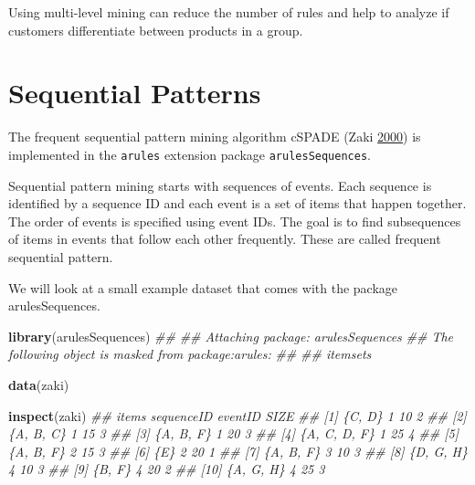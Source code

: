 \documentclass[
  notitlepage]{book}
\newenvironment{Shaded}{\begin{snugshade}}{\end{snugshade}}
\newcommand{\CommentTok}[1]{\textcolor[rgb]{0.56,0.35,0.01}{\textit{#1}}}
\newcommand{\KeywordTok}[1]{\textcolor[rgb]{0.13,0.29,0.53}{\textbf{#1}}}
\newcommand{\NormalTok}[1]{#1}
\begin{document}
Using multi-level mining can reduce the number of rules and help to analyze if
customers differentiate between products in a group.

\hypertarget{sequential-patterns}{%
\section{Sequential Patterns}\label{sequential-patterns}}

The frequent sequential pattern mining algorithm cSPADE (Zaki \protect\hyperlink{ref-Zaki2000}{2000}) is implemented in
the \texttt{arules} extension package \texttt{arulesSequences}.

Sequential pattern mining starts with sequences of events.
Each sequence is identified by a sequence ID and
each event is a set of items that happen together.
The order of events is specified using
event IDs. The goal is to find subsequences of items in events that
follow each other frequently. These are called frequent sequential pattern.

We will look at a small example dataset that comes with the package
arulesSequences.

\begin{Shaded}
\begin{Highlighting}[]
\KeywordTok{library}\NormalTok{(arulesSequences)}
\CommentTok{\#\# }
\CommentTok{\#\# Attaching package: \textquotesingle{}arulesSequences\textquotesingle{}}
\CommentTok{\#\# The following object is masked from \textquotesingle{}package:arules\textquotesingle{}:}
\CommentTok{\#\# }
\CommentTok{\#\#     itemsets}
\end{Highlighting}
\end{Shaded}

\begin{Shaded}
\begin{Highlighting}[]
\KeywordTok{data}\NormalTok{(zaki)}

\KeywordTok{inspect}\NormalTok{(zaki)}
\CommentTok{\#\#      items        sequenceID eventID SIZE}
\CommentTok{\#\# [1]  \{C, D\}       1          10      2   }
\CommentTok{\#\# [2]  \{A, B, C\}    1          15      3   }
\CommentTok{\#\# [3]  \{A, B, F\}    1          20      3   }
\CommentTok{\#\# [4]  \{A, C, D, F\} 1          25      4   }
\CommentTok{\#\# [5]  \{A, B, F\}    2          15      3   }
\CommentTok{\#\# [6]  \{E\}          2          20      1   }
\CommentTok{\#\# [7]  \{A, B, F\}    3          10      3   }
\CommentTok{\#\# [8]  \{D, G, H\}    4          10      3   }
\CommentTok{\#\# [9]  \{B, F\}       4          20      2   }
\CommentTok{\#\# [10] \{A, G, H\}    4          25      3}
\end{Highlighting}
\end{Shaded}
\end{document}
